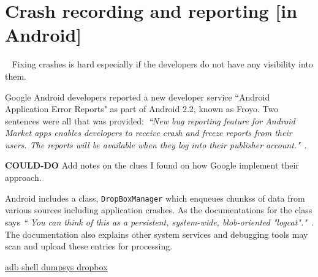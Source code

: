\chapter{Crash recording and reporting [in Android]}~\label{app:crash-recording-and-reporting-in-android}
Fixing crashes is hard especially if the developers do not have any visibility into them. 


Google Android developers reported a new developer service ``Android Application Error Reports" as part of Android 2.2, known as Froyo. Two sentences were all that was provided:~\emph{``New bug reporting feature for Android Market apps enables developers to receive crash and freeze reports from their users. The reports will be available when they log into their publisher account."}~\citep{android2010_froyo_highlights_new_developer_services}.

\textbf{COULD-DO} Add notes on the clues I found on how Google implement their approach.

Android includes a class, \texttt{DropBoxManager} which enqueues chunkss of data from various sources including application crashes. As the documentations for the class says \emph{`` You can think of this as a persistent, system-wide, blob-oriented "logcat"."}~\citep{android_dropboxmanager}. The documentation also explains other system services and debugging tools may scan and upload these entries for processing.

\url{}

\href{https://github.com/operando/Android-Command-Note}{adb shell dumpsys dropbox}




